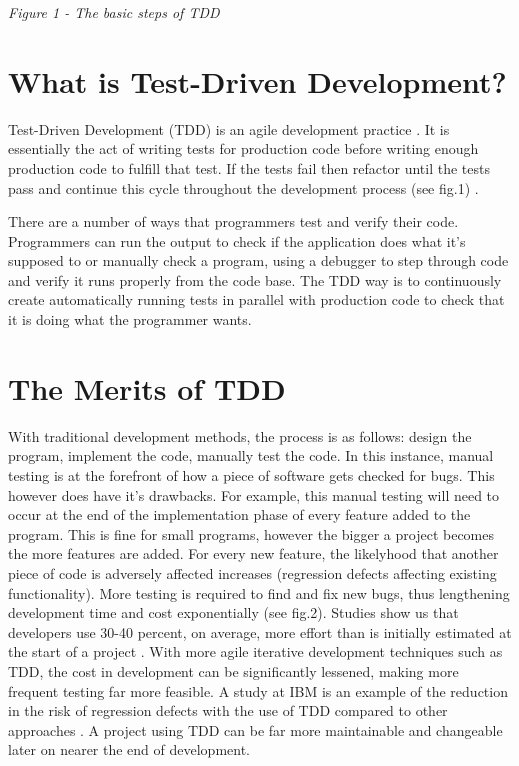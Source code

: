 \documentclass{scrartcl}
\begin{document}
\begin{center}
\textit{Figure 1 - The basic steps of TDD}
\end{center}

\section{What is Test-Driven Development?}

Test-Driven Development (TDD) is an agile development practice \cite{beck2001manifesto:1}. It is essentially the act of writing tests for production code before writing enough production code to fulfill that test. If the tests fail then refactor until the tests pass and continue this cycle throughout the development process (see fig.1) \cite{beck2003test:2}.

There are a number of ways that programmers test and verify their code. Programmers can run the output to check if the application does what it's supposed to or manually check a program, using a debugger to step through code and verify it runs properly from the code base. The TDD way is to continuously create automatically running tests in parallel with production code to check that it is doing what the programmer wants.

\section{The Merits of TDD}

With traditional development methods, the process is as follows: design the program, implement the code, manually test the code. In this instance, manual testing is at the forefront of how a piece of software gets checked for bugs. This however does have it's drawbacks. For example, this manual testing will need to occur at the end of the implementation phase of every feature added to the program. This is fine for small programs, however the bigger a project becomes the more features are added. For every new feature, the likelyhood that another piece of code is adversely affected increases (regression defects affecting existing functionality). More testing is required to find and fix new bugs, thus lengthening development time and cost exponentially \cite{boehm1981software} (see fig.2). Studies show us that developers use 30-40 percent, on average, more effort than is initially estimated at the start of a  project \cite{jorgensen2007systematic}. With more agile iterative development techniques such as TDD, the cost in development can be significantly lessened, making more frequent testing far more feasible. A study at IBM is an example of the reduction in the risk of regression defects with the use of TDD compared to other approaches \cite{williams2003test}. A project using TDD can be far more maintainable and changeable later on nearer the end of development. 
\end{document}
